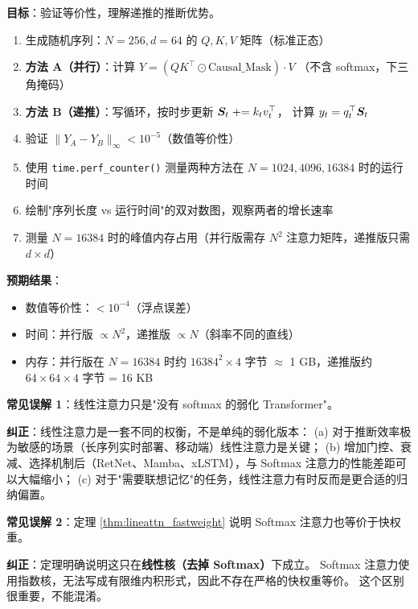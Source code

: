 \begin{labbox}[title=Lab 5：实验对比线性注意力的并行实现与递推实现]
\textbf{目标}：验证等价性，理解递推的推断优势。

\begin{enumerate}
  \item 生成随机序列：$N=256, d=64$ 的 $Q, K, V$ 矩阵（标准正态）
  \item \textbf{方法 A（并行）}：计算 $Y = (Q K^\top \odot \text{Causal\_Mask}) \cdot V$
        （不含 softmax，下三角掩码）
  \item \textbf{方法 B（递推）}：写循环，按时步更新 $\boldsymbol{S}_t \mathrel{+}= k_t v_t^\top$，
        计算 $y_t = q_t^\top \boldsymbol{S}_t$
  \item 验证 $\|Y_A - Y_B\|_\infty < 10^{-5}$（数值等价性）
  \item 使用 \texttt{time.perf\_counter()} 测量两种方法在 $N=1024, 4096, 16384$ 时的运行时间
  \item 绘制"序列长度 vs 运行时间"的双对数图，观察两者的增长速率
  \item 测量 $N=16384$ 时的峰值内存占用（并行版需存 $N^2$ 注意力矩阵，递推版只需 $d\times d$）
\end{enumerate}

\textbf{预期结果}：
\begin{itemize}
  \item 数值等价性：$< 10^{-4}$（浮点误差）
  \item 时间：并行版 $\propto N^2$，递推版 $\propto N$（斜率不同的直线）
  \item 内存：并行版在 $N=16384$ 时约 $16384^2 \times 4$ 字节 $\approx$ 1 GB，递推版约 $64 \times 64 \times 4$ 字节 = 16 KB
\end{itemize}
\end{labbox}

\begin{misconceptionbox}
\textbf{常见误解 1}：线性注意力只是"没有 softmax 的弱化 Transformer"。

\textbf{纠正}：线性注意力是一套不同的权衡，不是单纯的弱化版本：
(a) 对于推断效率极为敏感的场景（长序列实时部署、移动端）线性注意力是关键；
(b) 增加门控、衰减、选择机制后（RetNet、Mamba、xLSTM），与 Softmax 注意力的性能差距可以大幅缩小；
(c) 对于"需要联想记忆"的任务，线性注意力有时反而是更合适的归纳偏置。
\end{misconceptionbox}

\begin{misconceptionbox}
\textbf{常见误解 2}：定理 \ref{thm:lineattn_fastweight} 说明 Softmax 注意力也等价于快权重。

\textbf{纠正}：定理明确说明这只在\textbf{线性核（去掉 Softmax）}下成立。
Softmax 注意力使用指数核，无法写成有限维内积形式，因此不存在严格的快权重等价。
这个区别很重要，不能混淆。
\end{misconceptionbox}

